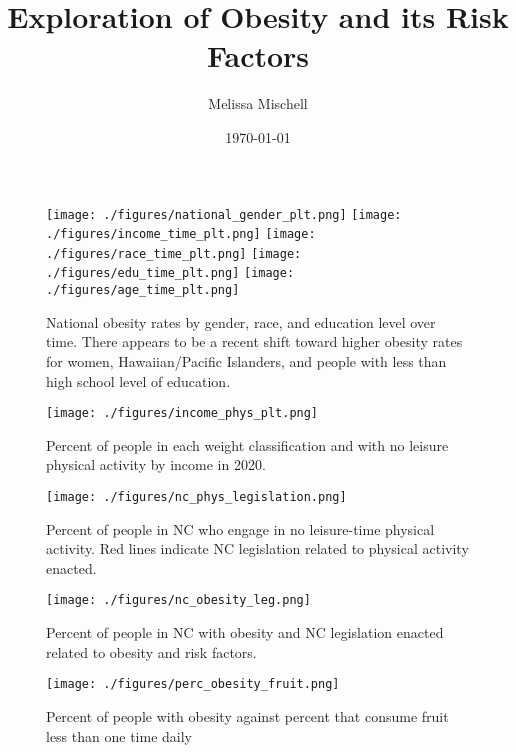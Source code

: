 \documentclass[11pt]{article}
\title{Exploration of Obesity and its Risk Factors}
\author{Melissa Mischell}
\date{\today}
\begin{document}
\maketitle

\begin{figure}[hp]
\texttt{[image: ./figures/national\_gender\_plt.png]}
\texttt{[image: ./figures/income\_time\_plt.png]}
\texttt{[image: ./figures/race\_time\_plt.png]}
\texttt{[image: ./figures/edu\_time\_plt.png]}
\texttt{[image: ./figures/age\_time\_plt.png]}
\caption{
  National obesity rates by gender, race, and education level over time. There appears to be a recent shift toward higher obesity rates for women, Hawaiian/Pacific Islanders, and people with less than high school level of education. 
}
\label{fig:dems_by_time}
\end{figure}

\begin{figure}[h]
\texttt{[image: ./figures/income\_phys\_plt.png]}
\caption{
  Percent of people in each weight classification and with no leisure physical activity by income in 2020.
}
\label{fig:income_pa}
\end{figure}


\begin{figure}[h]
\texttt{[image: ./figures/nc\_phys\_legislation.png]}
\caption{
  Percent of people in NC who engage in no leisure-time physical activity. 
  Red lines indicate NC legislation related to physical activity enacted.
}
\label{fig:phys_act}
\end{figure}

\begin{figure}[h]
\texttt{[image: ./figures/nc\_obesity\_leg.png]}
\caption{
  Percent of people in NC with obesity and NC legislation enacted related to obesity and risk factors. 
}
\label{fig:nc_obesity}
\end{figure}


\begin{figure}[h]
\texttt{[image: ./figures/perc\_obesity\_fruit.png]}
\caption{
  Percent of people with obesity against percent that consume fruit less than one time daily
}
\label{fig:obesity_fruit}
\end{figure}
\end{document}
